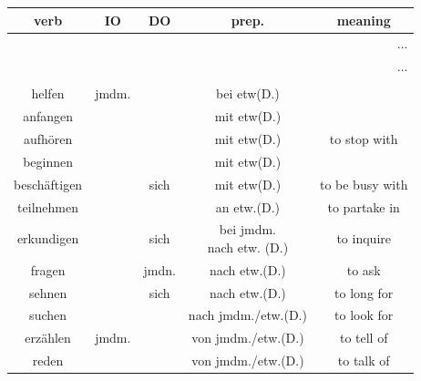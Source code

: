\begin{center}
    \begin{longtable}{|c|c|c|c|c|}
        \hline
        \rowcolor{gray}
        verb          & IO    & DO    & prep.               & meaning                   \\
        \hline
        \endfirsthead
        \multicolumn{5}{r}{...}                                                         \\
        \hline
        \endhead
        \hline
        \multicolumn{5}{r}{...}                                                         \\
        \endfoot
        \hline
        \endlastfoot
        \hline
        \multicolumn{5}{|c|}{Verben mit Dativepräpositionen}                            \\
        \hline
        helfen        & jmdm. &       & bei etw(D.)         &                           \\
        \hhline{|=====|}
        anfangen      &       &       & mit etw(D.)         &                           \\
        \hline
        aufhören      &       &       & mit etw(D.)         & to stop with              \\
        \hline
        beginnen      &       &       & mit etw(D.)         &                           \\
        \hline
        beschäftigen  &       & sich  & mit etw(D.)         & to be busy with           \\
        \hhline{|=====|}
        teilnehmen    &       &       & an etw.(D.)         & to partake in             \\
        \hhline{|=====|}
        erkundigen    &       & sich  & \makecell{bei jmdm.                             \\ nach etw. (D.)} & to inquire \\
        \hline
        fragen        &       & jmdn. & nach etw.(D.)       & to ask                    \\
        \hline
        sehnen        &       & sich  & nach etw.(D.)       & to long for               \\
        \hline
        suchen        &       &       & nach jmdm./etw.(D.) & to look for               \\
        \hhline{|=====|}
        erzählen      & jmdm. &       & von jmdm./etw.(D.)  & to tell of                \\
        \hline
        reden         &       &       & von jmdm./etw.(D.)  & to talk of                \\

\end{longtable}
\end{center}
